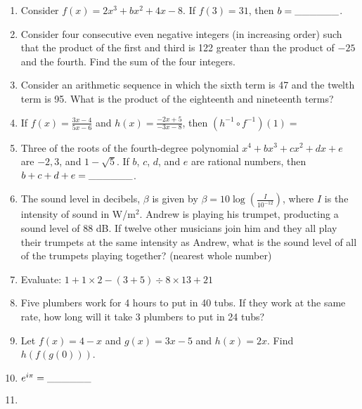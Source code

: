 \documentclass[../uilmath.tex]{subfiles}
\begin{document}
\begin{enumerate}[label=\bfseries\arabic*.]
        \item %
        Consider $f(x)=2x^3+bx^2+4x-8$. If $f(3)=31$, then $b=\_\_\_\_\_\_$.

        \item %
        Consider four consecutive even negative integers (in increasing order) such that the product of the first and third 
        is 122 greater than the product of $-25$ and the fourth. Find the sum of the four integers.

        \item %
        Consider an arithmetic sequence in which the sixth term is 47 and the twelth term is 95. What is the product of the eighteenth and nineteenth terms?

        \item %
        If $f(x)=\frac{3x-4}{5x-6}$ and $h(x)=\frac{-2x+5}{-3x-8}$, then $\left(h^{-1}\circ f^{-1}\right)(1)=$

        \item %
        Three of the roots of the fourth-degree polynomial $x^4+bx^3+cx^2+dx+e$ are $-2,3$, and $1-\sqrt{5}$. If $b$, $c$, $d$, and $e$
        are rational numbers, then $b+c+d+e=\_\_\_\_\_\_$.

        \item %
        The sound level in decibels, $\beta$ is given by $\beta = 10\log\left(\frac{I}{10^{-12}}\right)$, where $I$ is the intensity of sound in W/m$^2$.
        Andrew is playing his trumpet, producting a sound level of 88 dB. If twelve other musicians join him and they all play their trumpets at the same intensity as Andrew,
        what is the sound level of all of the trumpets playing together? (nearest whole number)

        \item %
        Evaluate: $1+1\times 2-(3+5)\div 8\times 13+21$

        \item %
        Five plumbers work for 4 hours to put in 40 tubs. If they work at the same rate, how long will it take 3 plumbers to put in 24 tubs?

        \item %
        Let $f(x)=4-x$ and $g(x)=3x-5$ and $h(x)=2x$. Find $h(f(g(0)))$.

        \item %
        $e^{i\pi}=\_\_\_\_\_\_$

        \item %
        
\end{enumerate}
\end{document}
